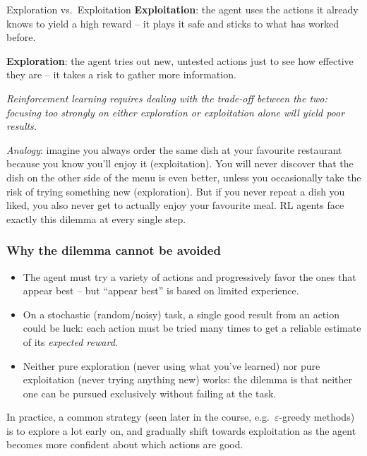 \begin{defbox}{Exploration vs.\ Exploitation}
\textbf{Exploitation}: the agent uses the actions it already knows to yield a high
reward -- it plays it safe and sticks to what has worked before.

\textbf{Exploration}: the agent tries out new, untested actions just to see how
effective they are -- it takes a risk to gather more information.

\textit{Reinforcement learning requires dealing with the trade-off between the two:
focusing too strongly on either exploration or exploitation alone will yield poor
results.}
\end{defbox}

\textit{Analogy}: imagine you always order the same dish at your favourite
restaurant because you know you'll enjoy it (exploitation). You will never
discover that the dish on the other side of the menu is even better, unless you
occasionally take the risk of trying something new (exploration). But if you
never repeat a dish you liked, you also never get to actually enjoy your
favourite meal. RL agents face exactly this dilemma at every single step.

\subsubsection{Why the dilemma cannot be avoided}

\begin{itemize}
  \item The agent must try a variety of actions and progressively favor the ones
        that appear best -- but ``appear best'' is based on limited experience.
  \item On a stochastic (random/noisy) task, a single good result from an action
        could be luck: each action must be tried many times to get a reliable
        estimate of its \textit{expected reward}.
  \item Neither pure exploration (never using what you've learned) nor pure
        exploitation (never trying anything new) works: the dilemma is that
        neither one can be pursued exclusively without failing at the task.
\end{itemize}

In practice, a common strategy (seen later in the course, e.g.\ $\varepsilon$-greedy
methods) is to explore a lot early on, and gradually shift towards exploitation as
the agent becomes more confident about which actions are good.

